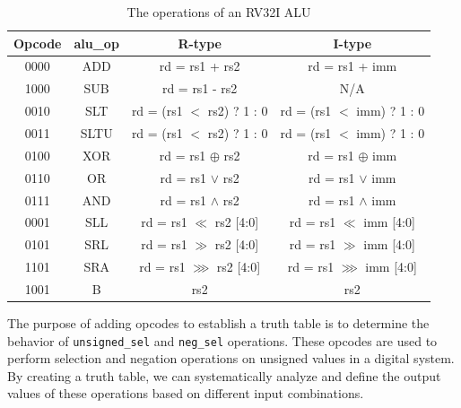 \documentclass[12pt,a4paper,oneside]{book} %
\begin{document}
\begin{table}[H]
\centering
\caption{The operations of an RV32I ALU}
\begin{tabular}{|c|c|c|c|}
\hline
\textbf{Opcode} & \textbf{alu\_op} & \textbf{R-type}          & \textbf{I-type}            \\ \hline
0000            & ADD             & rd = rs1 + rs2           & rd = rs1 + imm             \\ \hline
1000            & SUB             & rd = rs1 - rs2           & N/A                        \\ \hline
0010            & SLT             & rd = (rs1 $<$ rs2) ? 1 : 0 & rd = (rs1 $<$ imm)  ?  1 : 0 \\ \hline
0011            & SLTU            & rd = (rs1 $<$ rs2) ? 1 : 0 & rd = (rs1 $<$ imm)  ?  1 : 0 \\ \hline
0100            & XOR             & rd = rs1 $\oplus$ rs2           & rd = rs1 $\oplus$ imm             \\ \hline
0110            & OR              & rd = rs1 $\vee$ rs2           & rd = rs1 $\vee$ imm             \\ \hline
0111            & AND             & rd = rs1 $\wedge$ rs2           & rd = rs1 $\wedge$  imm             \\ \hline
0001            & SLL             & rd = rs1 $\ll$ rs2 [4:0]    & rd = rs1 $\ll$ imm [4:0]      \\ \hline
0101            & SRL             & rd = rs1 $\gg$ rs2 [4:0]    & rd = rs1 $\gg$ imm [4:0]      \\ \hline
1101            & SRA             & rd = rs1 $\ggg$ rs2 [4:0]   & rd = rs1 $\ggg$ imm [4:0]     \\ \hline
1001            & B            & rs2                      & rs2                        \\ \hline
\end{tabular}
\end{table}
The purpose of adding opcodes to establish a truth table is to determine the behavior of \texttt{unsigned\_sel} and \texttt{neg\_sel} operations. These opcodes are used to perform selection and negation operations on unsigned values in a digital system. By creating a truth table, we can systematically analyze and define the output values of these operations based on different input combinations.
\end{document}
